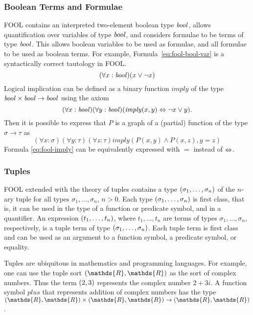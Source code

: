\documentclass{easychair}
\begin{document}
\subsubsection{Boolean Terms and Formulae}

FOOL contains an interpreted two-element boolean type $\mathit{bool}$, allows 
quantification over variables of type $\mathit{bool}$, and considers formulae to 
be terms of type $\mathit{bool}$.
This allows boolean variables to be used as formulae, and all formulae to be 
used as boolean terms.
For example, Formula~\ref{eq:fool-bool-var} is a syntactically correct 
tautology in FOOL.
\begin{equation}\label{eq:fool-bool-var}
(\forall x:\mathit{bool})(x \lor \neg x)
\end{equation}
Logical implication can be defined as a binary function
$\mathit{imply}$ of the type $\mathit{bool} \times \mathit{bool} \to \mathit{bool}$ using the axiom
\begin{equation}\label{eq:fool-imply}
(\forall x:\mathit{bool})(\forall y:\mathit{bool})(\mathit{imply}(x,y) \Leftrightarrow \neg x \lor y).
\end{equation}
Then it is possible to express that $P$ is a graph of a (partial) function of 
the type $\sigma \to \tau$ as
\begin{equation}\label{eq:bool-arg-example}
(\forall x:\sigma)(\forall y:\tau)(\forall z:\tau)
\mathit{imply}(P(x,y) \land P(x,z), y = z)
\end{equation}
Formula \ref{eq:fool-imply} can be equivalently expressed with $=$ instead of
$\Leftrightarrow$.

\subsubsection{Tuples}
FOOL extended with the theory of tuples contains a type
$({\sigma_1,\ldots,\sigma_n})$ of the $n$-ary tuple for all types
$\sigma_1,\ldots,\sigma_n$, $n>0$. Each type
$({\sigma_1,\ldots,\sigma_n})$ is first class, that is, it can be
used in the type of a function or predicate symbol, and in a quantifier. 
An expression $({t_1,\ldots,t_n})$, where $t_1,\ldots,t_n$ are
terms of types $\sigma_1,\ldots,\sigma_n$, respectively, is a tuple term of 
type $({\sigma_1,\ldots,\sigma_n})$. 
Each tuple term is first class and can be used as an argument to a function 
symbol, a predicate symbol, or equality.

Tuples are ubiquitous in mathematics and programming languages. For example,
one can use the tuple sort $\tuple{\mathds{R},\mathds{R}}$ as the sort of
complex numbers. 
Thus the term $({2,3})$ represents the complex number $2+3i$. 
A function symbol $\mathit{plus}$ that represents addition of complex numbers 
has the type $\tuple{\mathds{R},\mathds{R}} \times 
\tuple{\mathds{R},\mathds{R}} \to \tuple{\mathds{R},\mathds{R}}$.
\end{document}
